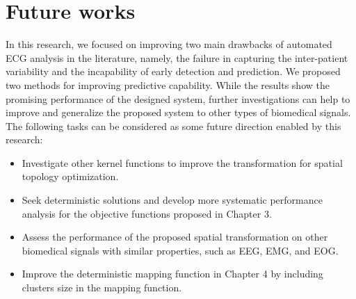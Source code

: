 \section{Future works}
In this research, we focused on improving two main drawbacks of automated ECG analysis in the literature, namely, the failure in capturing the inter-patient variability and the incapability of early detection and prediction. We proposed two methods for improving predictive capability. While the results show the promising performance of the designed system, further investigations can help to improve and generalize the proposed system to other types of biomedical signals. The following tasks can be considered as some future direction enabled by this research:
 \begin{itemize}
\item Investigate other kernel functions to improve the transformation for spatial topology optimization.
\item Seek deterministic solutions and develop more systematic performance analysis for the objective functions proposed in Chapter 3.
\item Assess the performance of the proposed spatial transformation on other biomedical signals with similar properties, such as EEG, EMG, and EOG.
\item  Improve the deterministic mapping function in Chapter 4 by including clusters size in the mapping function.
\end{itemize}

